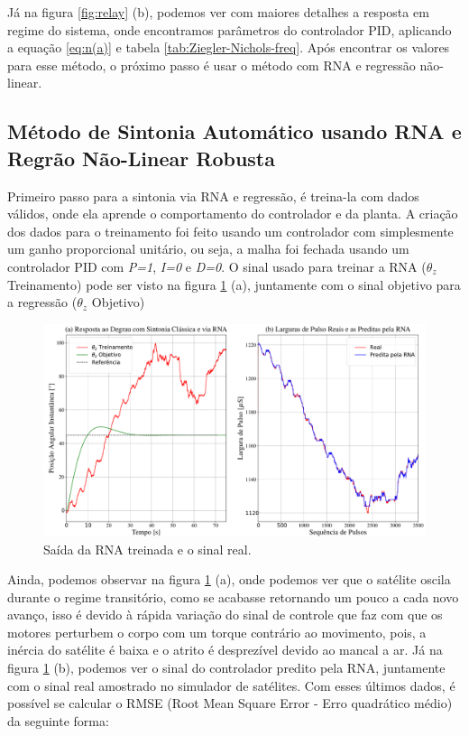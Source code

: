 Já na figura \ref{fig:relay} (b), podemos ver com maiores detalhes a resposta em regime do sistema, onde encontramos parâmetros do controlador PID, aplicando a equação \ref{eq:n(a)} e tabela \ref{tab:Ziegler-Nichols-freq}. Após encontrar os valores para esse método, o próximo passo é usar o método com RNA e regressão não-linear.



\subsection{Método de Sintonia Automático usando RNA e Regrão Não-Linear Robusta}

Primeiro passo para a sintonia via RNA e regressão, é treina-la com dados válidos, onde ela aprende o comportamento do controlador e da planta. A criação dos dados para o treinamento foi feito usando um controlador com simplesmente um ganho proporcional unitário, ou seja, a malha foi fechada usando um controlador PID com \textit{P=1}, \textit{I=0} e \textit{D=0}. O sinal usado para treinar a RNA ($\theta_z$ Treinamento) pode ser visto na figura \ref{fig:neural_output} (a), juntamente com o sinal objetivo para a regressão ($\theta_z$ Objetivo)

\begin{figure}[H]
  \caption{Saída da RNA treinada e o sinal real.}
  \begin{center}
      \includegraphics[scale=0.34]{resultados/img/neural_output}
  \end{center}
  \label{fig:neural_output}
\end{figure}

Ainda, podemos observar na figura \ref{fig:neural_output} (a), onde podemos ver que o satélite oscila durante o regime transitório, como se acabasse retornando um pouco a cada novo avanço, isso é devido à rápida variação do sinal de controle que faz com que os motores perturbem o corpo com um torque contrário ao movimento, pois, a inércia do satélite é baixa e o atrito é desprezível devido ao mancal a ar. Já na figura \ref{fig:neural_output} (b), podemos ver o sinal do controlador predito pela RNA, juntamente com o sinal real amostrado no simulador de satélites. Com esses últimos dados, é possível se calcular o RMSE (Root Mean Square Error - Erro quadrático médio) da seguinte forma:

